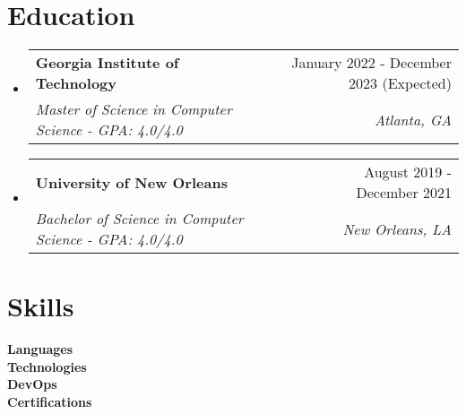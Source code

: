 \documentclass[letterpaper,11pt]{article}
\makeatletter
\newcommand{\resumeItem}[1]{
  \item\small{
    {#1 \vspace{-2pt}}
  }
}
\newcommand{\resumeSubheading}[4]{
  \vspace{-2pt}\item
    \begin{tabular*}{0.97\textwidth}[t]{l@{\extracolsep{\fill}}r}
      \textbf{#1} & #2 \\
      \textit{\small#3} & \textit{\small #4} \\
    \end{tabular*}\vspace{-7pt}
}
\newcommand{\resumeSubHeadingListStart}{\begin{itemize}[leftmargin=0.15in, label={}]}
\newcommand{\resumeSubHeadingListEnd}{\end{itemize}}
\newcommand{\resumeItemListStart}{\begin{itemize}}
\newcommand{\resumeItemListEnd}{\end{itemize}\vspace{-5pt}}
\makeatother
\begin{document}
\section{Education}
  \resumeSubHeadingListStart
    \resumeSubheading
      {Georgia Institute of Technology}{January 2022 - December 2023 (Expected)}
      {Master of Science in Computer Science - GPA: 4.0/4.0}{Atlanta, GA}
        
    \resumeSubheading
      {University of New Orleans}{August 2019 - December 2021}
      {Bachelor of Science in Computer Science - GPA: 4.0/4.0}{New Orleans, LA}
  \resumeSubHeadingListEnd
  

%
\section{Skills}
 \begin{itemize}[leftmargin=0.15in, label={}]
    \small{\item{
     \textbf{Languages}\hspace*{1cm}{Python, Java, HTML, CSS, JavaScript, SQL} \\
     \textbf{Technologies}\hspace*{0.6cm}{Git, Unity, Jupyter Notebook} \\
     \textbf{DevOps}\hspace*{1.4cm}{Amazon Web Services (AWS), Terraform, GitHub Actions} \\
     \textbf{Certifications}\hspace*{0.4cm}{AWS Solutions Architect - Associate, AWS Cloud Practitioner} 
    }}
 \end{itemize}

\end{document}
